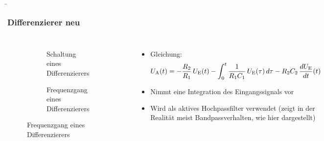 \begin{frame}
    \b{
    \frametitle{Differenzierer neu}
    \begin{columns}
        \centering
        \begin{figure}
    \centering

    \begin{subfigure}{\linewidth}
        \centering
        \resizebox{0.6\linewidth}{!}{}
        \caption{Schaltung eines Differenzierers}
    \end{subfigure}

    \vspace{0.5cm} 

    \begin{subfigure}{\linewidth}
        \centering
        \resizebox{0.6\linewidth}{!}{}
        \caption{Frequenzgang eines Differenzierers}
    \end{subfigure}

\end{figure}

        \raggedleft
        \begin{itemize}
            \item Gleichung:
          \[
U_{\textnormal{A}}(t) = 
- \frac{R_2}{R_1} \, U_{\textnormal{E}}(t)
- \int_0^t \frac{1}{R_1 C_1} \, U_{\textnormal{E}}(\tau) \, d\tau
- R_2 C_2 \, \frac{dU_{\textnormal{E}}}{dt}(t)
\]

        \item Nimmt eine Integration des Eingangssignals vor
        \item Wird als aktives Hochpassfilter verwendet (zeigt in der Realität meist Bandpassverhalten, wie hier dargestellt)  
    \end{itemize}
    \end{columns}
    }
\end{frame}


